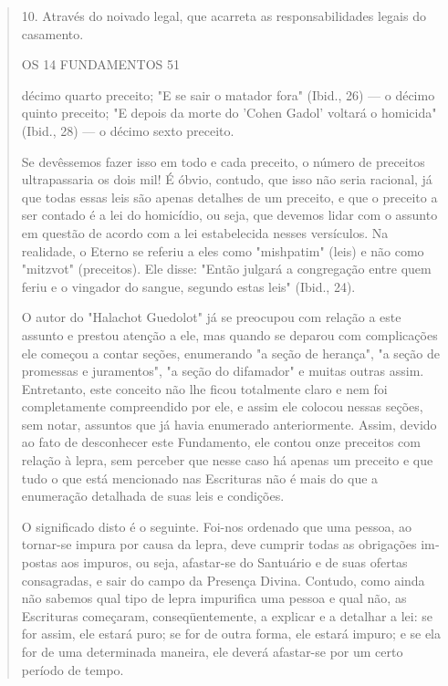 \begin{quote}
10. Através do noivado legal, que acarreta as responsabilidades legais
do casamento.

OS 14 FUNDAMENTOS 51

décimo quarto preceito; "E se sair o matador fora" (Ibid., 26) --- o
décimo quinto preceito; "E depois da morte do 'Cohen Gadol' voltará o
homicida" (Ibid., 28) --- o décimo sexto preceito.

Se devêssemos fazer isso em todo e cada preceito, o número de pre­ceitos
ultrapassaria os dois mil! É óbvio, contudo, que isso não seria
racional, já que todas essas leis são apenas detalhes de um preceito, e
que o preceito a ser contado é a lei do homicídio, ou seja, que devemos
lidar com o assunto em questão de acordo com a lei estabelecida nesses
versículos. Na realidade, o Eterno se referiu a eles como "mishpatim"
(leis) e não como "mitzvot" (pre­ceitos). Ele disse: "Então julgará a
congregação entre quem feriu e o vingador do sangue, segundo estas leis"
(Ibid., 24).

O autor do "Halachot Guedolot" já se preocupou com relação a es­te
assunto e prestou atenção a ele, mas quando se deparou com complicações
ele começou a contar seções, enumerando "a seção de herança", "a seção
de promessas e juramentos", "a seção do difamador" e muitas outras
assim. En­tretanto, este conceito não lhe ficou totalmente claro e nem
foi completamen­te compreendido por ele, e assim ele colocou nessas
seções, sem notar, assun­tos que já havia enumerado anteriormente.
Assim, devido ao fato de desconhe­cer este Fundamento, ele contou onze
preceitos com relação à lepra, sem per­ceber que nesse caso há apenas um
preceito e que tudo o que está mencionado nas Escrituras não é mais do
que a enumeração detalhada de suas leis e condições.

O significado disto é o seguinte. Foi-nos ordenado que uma pessoa, ao
tornar-se impura por causa da lepra, deve cumprir todas as obrigações
im­postas aos impuros, ou seja, afastar-se do Santuário e de suas
ofertas consagra­das, e sair do campo da Presença Divina. Contudo, como
ainda não sabemos qual tipo de lepra impurifica uma pessoa e qual não,
as Escrituras começaram, conseqüentemente, a explicar e a detalhar a
lei: se for assim, ele estará puro; se for de outra forma, ele estará
impuro; e se ela for de uma determinada ma­neira, ele deverá afastar-se
por um certo período de tempo.


\end{quote}
